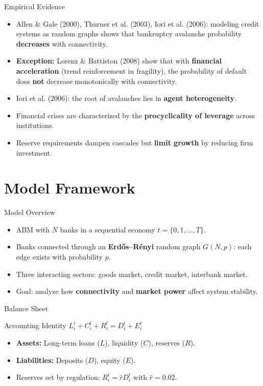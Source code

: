 \begin{frame}{Empirical Evidence}
  \begin{itemize}
    \item Allen \& Gale (2000), Thurner et al. (2003), Iori et al. (2006): modeling credit systems as random graphs shows that bankruptcy avalanche probability \textbf{decreases} with connectivity.
    \item \textbf{Exception:} Lorenz \& Battiston (2008) show that with \textbf{financial acceleration} (trend reinforcement in fragility), the probability of default does \textbf{not} decrease monotonically with connectivity.
    \item Iori et al. (2006): the root of avalanches lies in \textbf{agent heterogeneity}.
    \item Financial crises are characterized by the \textbf{procyclicality of leverage} across institutions.
    \item Reserve requirements dampen cascades but \textbf{limit growth} by reducing firm investment.
  \end{itemize}
\end{frame}

\section{Model Framework}\label{sec:3}

\begin{frame}{Model Overview}
  \begin{itemize}
    \item ABM with $N$ banks in a sequential economy $t = \{0, 1, \dots, T\}$.
    \item Banks connected through an \textbf{Erd\H{o}s--R\'enyi} random graph $G(N, p)$: each edge exists with probability $p$.
    \item Three interacting sectors: goods market, credit market, interbank market.
    \item Goal: analyze how \textbf{connectivity} and \textbf{market power} affect system stability.
  \end{itemize}
\end{frame}

\begin{frame}{Balance Sheet}
  \begin{block}{Accounting Identity}
    $L_i^t + C_i^t + R_i^t = D_i^t + E_i^t$
  \end{block}
  \begin{itemize}
    \item \textbf{Assets:} Long-term loans ($L$), liquidity ($C$), reserves ($R$).
    \item \textbf{Liabilities:} Deposits ($D$), equity ($E$).
    \item Reserves set by regulation: $R_i^t = \hat{r} D_i^t$ with $\hat{r} = 0.02$.
  \end{itemize}
\end{frame}

